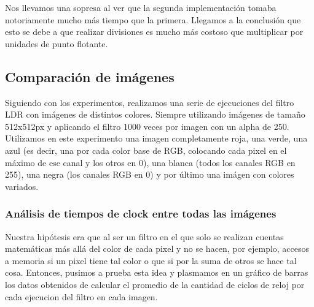 \documentclass[a4paper]{article}
\begin{document}
\begin{figure}[!ht]
    \centering
    \begin{floatrow}
    \end{floatrow}
\end{figure}

Nos llevamos una sopresa al ver que la segunda implementación tomaba notoriamente mucho más tiempo que la primera. Llegamos a la conclusión que esto se debe
a que realizar divisiones es mucho más costoso que multiplicar por unidades de punto flotante.

\subsection{Comparación de imágenes}
Siguiendo con los experimentos, realizamos una serie de ejecuciones del filtro LDR con imágenes de distintos colores. Siempre utilizando imágenes de
tamaño 512x512px y aplicando el filtro 1000 veces por imagen con un alpha de 250. Utilizamos en este experimento una imagen completamente roja, una verde, una azul (es decir,
una por cada color base de RGB, colocando cada pixel en el máximo de ese canal y los otros en 0), una blanca (todos los canales RGB en 255), una negra
(los canales RGB en 0) y por último una imágen con colores variados.

\subsubsection{Análisis de tiempos de clock entre todas las imágenes}
Nuestra hipótesis era que al ser un filtro en el que solo se realizan cuentas matemáticas
más allá del color de cada pixel y no se hacen, por ejemplo, accesos a memoria si un pixel tiene tal color o que si por la suma de otros se hace tal cosa. Entonces,
pusimos a prueba esta idea y plasmamos en un gráfico de barras los datos obtenidos de calcular el promedio de la cantidad de ciclos de reloj por cada ejecucion del filtro
en cada imagen.
\end{document}

